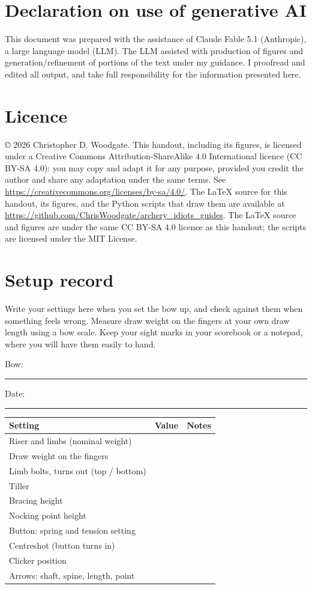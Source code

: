 \documentclass[11pt]{article}
\begin{document}
\vfill
\section*{Declaration on use of generative AI}
This document was prepared with the assistance of Claude Fable 5.1 (Anthropic), a large language model (LLM). The LLM assisted with production of figures and generation/refinement of portions of the text under my guidance. I proofread and edited all output, and take full responsibility for the information presented here.

\section*{Licence}
\copyright{} 2026 Christopher D. Woodgate. This handout, including its figures, is licensed under a Creative Commons Attribution-ShareAlike 4.0 International licence (CC BY-SA 4.0): you may copy and adapt it for any purpose, provided you credit the author and share any adaptation under the same terms. See \url{https://creativecommons.org/licenses/by-sa/4.0/}. The LaTeX source for this handout, its figures, and the Python scripts that draw them are available at \url{https://github.com/ChrisWoodgate/archery_idiots_guides}. The LaTeX source and figures are under the same CC BY-SA 4.0 licence as this handout; the scripts are licensed under the MIT License.

\clearpage
\section*{Setup record}
Write your settings here when you set the bow up, and check against them when something feels wrong. Measure draw weight on the fingers at your own draw length using a bow scale. Keep your sight marks in your scorebook or a notepad, where you will have them easily to hand.

\medskip
\noindent Bow: \rule{5cm}{0.4pt} \hfill Date: \rule{3cm}{0.4pt}

\medskip
\renewcommand{\arraystretch}{2.2}
\noindent\begin{tabular}{|p{5.6cm}|p{3.6cm}|p{6.4cm}|}
\hline
\textbf{Setting} & \textbf{Value} & \textbf{Notes} \\ \hline
Riser and limbs (nominal weight) & & \\ \hline
Draw weight on the fingers & & \\ \hline
Limb bolts, turns out (top / bottom) & & \\ \hline
Tiller & & \\ \hline
Bracing height & & \\ \hline
Nocking point height & & \\ \hline
Button: spring and tension setting & & \\ \hline
Centreshot (button turns in) & & \\ \hline
Clicker position & & \\ \hline
Arrows: shaft, spine, length, point & & \\ \hline
\end{tabular}

\renewcommand{\arraystretch}{1}
\end{document}
